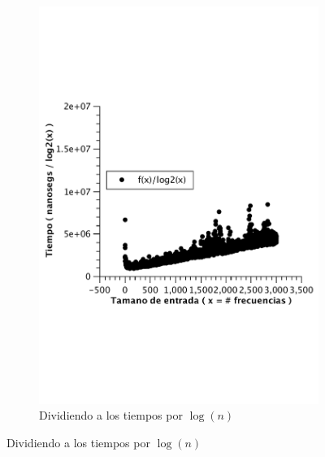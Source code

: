 \begin{figure}[H]
        \centering
        \begin{subfigure}[b]{0.5\textwidth}
                \includegraphics[width=\textwidth]{imagenes/af-wc-lineal.pdf}
                \caption*{Dividiendo a los tiempos por $\log(n)$}
        \end{subfigure}
\end{figure}

